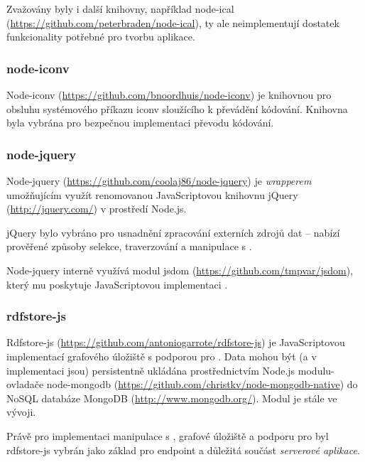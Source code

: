 Zvažovány byly i další knihovny, například node-ical (\url{https://github.com/peterbraden/node-ical}), ty ale neimplementují dostatek funkcionality potřebné pro tvorbu aplikace.

\subsubsection{node-iconv}
Node-iconv (\url{https://github.com/bnoordhuis/node-iconv}) je knihovnou pro obsluhu systémového příkazu iconv sloužícího k převádění kódování. Knihovna byla vybrána pro bezpečnou implementaci převodu kódování.

\subsubsection{node-jquery}
Node-jquery (\url{https://github.com/coolaj86/node-jquery}) je \textit{wrapperem} umožňujícím využít renomovanou JavaScriptovou knihovnu jQuery (\url{http://jquery.com/}) v prostředí Node.js.

jQuery bylo vybráno pro usnadnění zpracování externích zdrojů dat -- nabízí prověřené způsoby selekce, traverzování a manipulace s .

Node-jquery interně využívá modul jsdom (\url{https://github.com/tmpvar/jsdom}), který mu poskytuje JavaScriptovou implementaci .

\subsubsection{rdfstore-js}
\label{sec:rdfstore}
Rdfstore-js (\url{https://github.com/antoniogarrote/rdfstore-js}) je JavaScriptovou implementací  grafového úložiště s podporou pro . Data mohou být (a v implementaci  jsou) persistentně ukládána prostřednictvím Node.js modulu-ovladače node-mongodb (\url{https://github.com/christkv/node-mongodb-native}) do NoSQL databáze MongoDB (\url{http://www.mongodb.org/}). Modul je stále ve vývoji.

Právě pro implementaci manipulace s , grafové úložiště a podporu pro  byl rdfstore-js vybrán jako základ pro  endpoint a důležitá součást \textit{serverové aplikace}.



